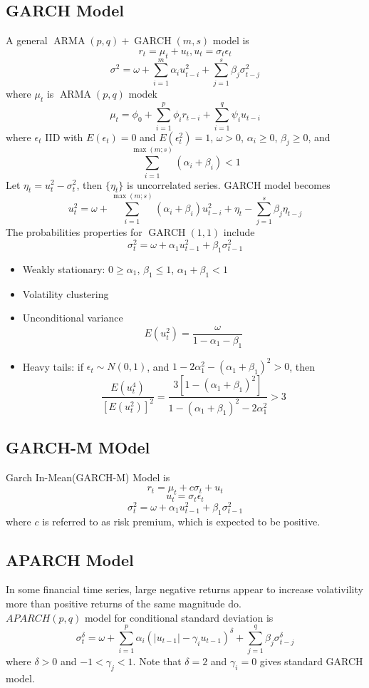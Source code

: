 \documentclass[12pt]{article}
\theoremstyle{definition}
\DeclareMathOperator{\ARMA}{ARMA}
\DeclareMathOperator{\GARCH}{GARCH}
\begin{document}
\subsection{GARCH Model}
A general $\ARMA(p,q) + \GARCH(m,s)$ model is
\[
r_t = \mu_t + u_t, u_t = \sigma_t \epsilon_t
\]
\[
\sigma^2 = \omega + \sum_{i=1}^m \alpha_i u_{t-i}^2 +\sum_{j=1}^s \beta_j\sigma_{t-j}^2 
\]
where $\mu_t$ is $\ARMA(p,q)$ modek
\[
\mu_t = \phi_0 + \sum_{i=1}^p \phi_i r_{t-i} + \sum_{i=1}^q \psi_i u_{t-i}
\]
where $\epsilon_t$ IID with $E(\epsilon_t) = 0$ and $E(\epsilon_t^2) = 1$, $\omega > 0$, $\alpha_i\geq 0$, $\beta_j\geq 0$, and
\[
\sum_{i=1}^{\max(m;s)} (\alpha_i + \beta_i) < 1
\]
Let $\eta_t = u_t^2 -\sigma_t^2$, then $\{\eta_t\}$ is uncorrelated series. GARCH model becomes
\[
u_t^2 = \omega + \sum_{i=1}^{\max(m;s)}(\alpha_i + \beta_i)u_{t-i}^2 + \eta_t -\sum_{j=1}^s \beta_j\eta_{t-j}
\]
The probabilities properties for $\GARCH(1,1)$ include
\[
\sigma^2_t =\omega + \alpha_1 u_{t-1}^2 + \beta_1 \sigma_{t-1}^2
\]
\begin{itemize}
\item Weakly stationary: $0\geq \alpha_1$, $\beta_1\leq 1$, $\alpha_1 + \beta_1 <1$
\item Volatility clustering
\item Unconditional variance 
\[
E(u_t^2) = \frac{\omega}{1-\alpha_1-\beta_1}
\]
\item Heavy tails: if $\epsilon_t \sim N(0,1)$, and $1-2\alpha_1^2 -(\alpha_1+\beta_1)^2 > 0$, then
\[
\frac{E(u_t^4)}{[E(u_t^2)]^2} = \frac{3[1-(\alpha_1 + \beta_1)^2]}{1-(\alpha_1 + \beta_1)^2 -2\alpha_1^2} > 3
\]
\end{itemize}
\subsection{GARCH-M MOdel}
Garch In-Mean(GARCH-M) Model is
\[
r_t = \mu_t + c\sigma_t + u_t
\]
\[
u_t = \sigma_t \epsilon_t
\]
\[
\sigma_t^2 = \omega + \alpha_1u_{t-1}^2 + \beta_1 \sigma_{t-1}^2
\]
where $c$ is referred to as risk premium, which is expected to be positive.
\subsection{APARCH Model}
In some financial time series, large negative returns appear to increase volativility more than positive returns of the same magnitude do.\\
$APARCH(p,q)$ model for conditional standard deviation is
\[
\sigma_t^\delta = \omega + \sum_{i=1}^p \alpha_i(|u_{t-1}| - \gamma_i u_{t-1})^\delta + \sum_{j=1}^q \beta_j\sigma_{t-j}^\delta
\]
where $\delta>0$ and $-1<\gamma_j < 1$. Note that $\delta = 2$ and $\gamma_i = 0$ gives standard GARCH model.\\
\end{document}
